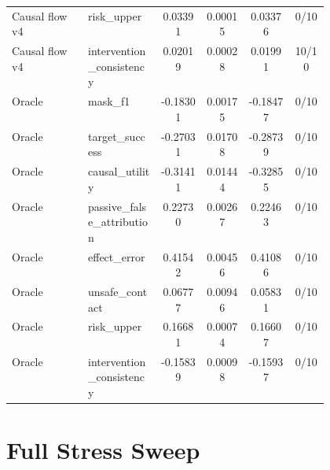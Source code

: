\documentclass{article}
\begin{document}
\begin{center}
\begin{longtable}{p{0.24\linewidth}p{0.23\linewidth}cccc}
Causal flow v4 & risk\_upper & 0.03391 & 0.00015 & 0.03376 & 0/10\\
Causal flow v4 & intervention\_consistency & 0.02019 & 0.00028 & 0.01991 & 10/10\\
Oracle & mask\_f1 & -0.18301 & 0.00175 & -0.18477 & 0/10\\
Oracle & target\_success & -0.27031 & 0.01708 & -0.28739 & 0/10\\
Oracle & causal\_utility & -0.31411 & 0.01444 & -0.32855 & 0/10\\
Oracle & passive\_false\_attribution & 0.22730 & 0.00267 & 0.22463 & 0/10\\
Oracle & effect\_error & 0.41542 & 0.00456 & 0.41086 & 0/10\\
Oracle & unsafe\_contact & 0.06777 & 0.00946 & 0.05831 & 0/10\\
Oracle & risk\_upper & 0.16681 & 0.00074 & 0.16607 & 0/10\\
Oracle & intervention\_consistency & -0.15839 & 0.00098 & -0.15937 & 0/10\\
\bottomrule
\end{longtable}
\normalsize
\end{center}

\section{Full Stress Sweep}
\end{document}
